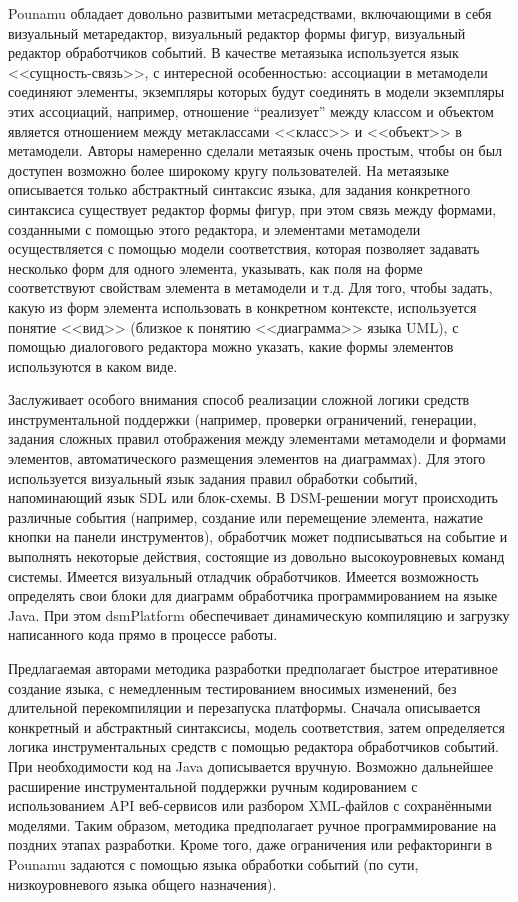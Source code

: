 Pounamu обладает довольно развитыми метасредствами, включающими в себя визуальный 
метаредактор, визуальный редактор формы фигур, визуальный редактор обработчиков событий. 
В качестве метаязыка используется язык <<сущность-связь>>, с интересной особенностью: 
ассоциации в метамодели соединяют элементы, экземпляры которых будут соединять в модели 
экземпляры этих ассоциаций, например, отношение “реализует” между классом и объектом 
является отношением между метаклассами <<класс>> и <<объект>> в метамодели. Авторы 
намеренно сделали метаязык очень простым, чтобы он был доступен возможно более широкому 
кругу пользователей. На метаязыке описывается только абстрактный синтаксис языка, для 
задания конкретного синтаксиса существует редактор формы фигур, при этом связь между 
формами, созданными с помощью этого редактора, и элементами метамодели осуществляется 
с помощью модели соответствия, которая позволяет задавать несколько форм для одного 
элемента, указывать, как поля на форме соответствуют свойствам элемента в метамодели 
и т.д. Для того, чтобы задать, какую из форм элемента использовать в конкретном контексте, 
используется понятие <<вид>> (близкое к понятию <<диаграмма>> языка UML), с помощью 
диалогового редактора можно указать, какие формы элементов используются в каком виде.

Заслуживает особого внимания способ реализации сложной логики средств инструментальной 
поддержки (например, проверки ограничений, генерации, задания сложных правил отображения 
между элементами метамодели и формами элементов, автоматического размещения элементов 
на диаграммах). Для этого используется визуальный язык задания правил обработки событий, 
напоминающий язык SDL или блок-схемы. В \ac{DSM}-решении могут происходить различные события 
(например, создание или перемещение элемента, нажатие кнопки на панели инструментов), 
обработчик может подписываться на событие и выполнять некоторые действия, состоящие из 
довольно высокоуровневых команд системы. Имеется визуальный отладчик обработчиков. 
Имеется возможность определять свои блоки для диаграмм обработчика программированием 
на языке Java. При этом \ac{dsmPlatform} обеспечивает динамическую компиляцию и загрузку 
написанного кода прямо в процессе работы.

Предлагаемая авторами методика разработки предполагает быстрое итеративное создание 
языка, с немедленным тестированием вносимых изменений, без длительной перекомпиляции 
и перезапуска платформы. Сначала описывается конкретный и абстрактный синтаксисы, 
модель соответствия, затем определяется логика инструментальных средств с помощью 
редактора обработчиков событий. При необходимости код на Java дописывается вручную. 
Возможно дальнейшее расширение инструментальной поддержки ручным кодированием с использованием 
\ac{API} веб-сервисов или разбором XML-файлов с сохранёнными моделями. Таким образом, методика
предполагает ручное программирование на поздних этапах разработки. Кроме того, даже 
ограничения или рефакторинги в Pounamu задаются с помощью языка обработки событий 
(по сути, низкоуровневого языка общего назначения).

